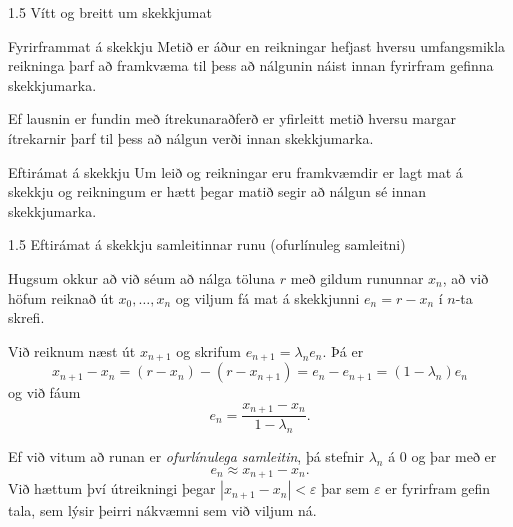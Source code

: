 % 
%
%
\begin{frame}{1.5 Vítt og breitt um skekkjumat } 

\begin{block}{Fyrirframmat á skekkju} 
Metið er áður en reikningar hefjast hversu umfangsmikla reikninga þarf 
að framkvæma til þess að nálgunin náist innan fyrirfram gefinna
skekkjumarka.

\medskip
Ef lausnin er fundin með ítrekunaraðferð er yfirleitt metið hversu
margar ítrekarnir þarf til þess að nálgun verði innan skekkjumarka.
\end{block}

\pause

\begin{block}{Eftirámat á skekkju}   Um leið og reikningar eru
framkvæmdir er lagt mat á skekkju og reikningum er hætt þegar matið
segir að nálgun sé innan skekkjumarka.
\end{block}
\end{frame}
%
%
\begin{frame}{1.5 Eftirámat á skekkju samleitinnar runu (ofurlínuleg samleitni)} 

Hugsum okkur að við séum að nálga töluna $r$ með gildum rununnar
$x_n$, að við höfum reiknað út $x_0,\dots,x_n$ 
og viljum fá mat á skekkjunni $e_n=r-x_n$ í $n$-ta skrefi. 

\smallskip
Við reiknum næst út $x_{n+1}$ og skrifum $e_{n+1}=\lambda_ne_n$.  Þá er 
\begin{equation*}
    x_{n+1}-x_n = (r-x_n)-(r-x_{n+1})
    = e_n-e_{n+1} = (1-\lambda_n)e_n
\end{equation*}
og við fáum 
\begin{equation*}
    e_n = \dfrac{x_{n+1}-x_n}{1-\lambda_n}.
\end{equation*}

Ef við vitum að runan er {\it ofurlínulega samleitin}, þá stefnir 
$\lambda_n$ á $0$ og þar með er 
\begin{equation*}
    e_n\approx x_{n+1}-x_n. 
\end{equation*}
Við hættum því útreikningi þegar $|x_{n+1}-x_n|<\varepsilon$
þar sem $\varepsilon$ er fyrirfram gefin tala, sem lýsir þeirri
nákvæmni sem við viljum ná.  
\end{frame}
%

